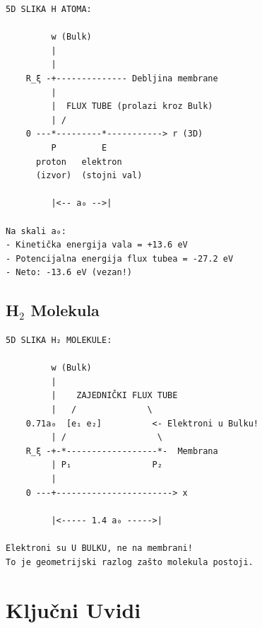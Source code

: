 \documentclass[12pt,a4paper]{article}
\begin{document}
\begin{verbatim}
5D SLIKA H ATOMA:

         w (Bulk)
         |
         |
    R_ξ -+-------------- Debljina membrane
         |   
         |  FLUX TUBE (prolazi kroz Bulk)
         | /
    0 ---*---------*-----------> r (3D)
         P         E
      proton   elektron
      (izvor)  (stojni val)
         
         |<-- a₀ -->|
         
Na skali a₀:
- Kinetička energija vala = +13.6 eV
- Potencijalna energija flux tubea = -27.2 eV
- Neto: -13.6 eV (vezan!)
\end{verbatim}

\subsection{H$_2$ Molekula}

\begin{verbatim}
5D SLIKA H₂ MOLEKULE:

         w (Bulk)
         |
         |    ZAJEDNIČKI FLUX TUBE
         |   /              \
    0.71a₀  [e₁ e₂]          <- Elektroni u Bulku!
         | /                  \
    R_ξ -+-*------------------*-  Membrana
         | P₁                P₂
         |
    0 ---+-----------------------> x
         
         |<----- 1.4 a₀ ----->|
         
Elektroni su U BULKU, ne na membrani!
To je geometrijski razlog zašto molekula postoji.
\end{verbatim}

\section{Ključni Uvidi}
\end{document}
